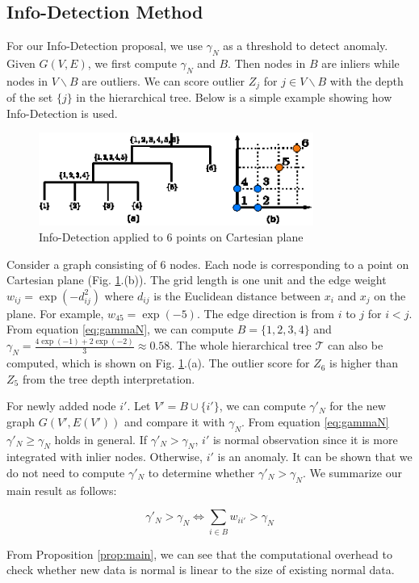 \documentclass[runningheads]{llncs}
\begin{document}
\subsection{Info-Detection Method}
For our Info-Detection proposal, we use $\gamma_N$ as a threshold to detect anomaly.  Given $G(V, E)$, we first compute $\gamma_N$ and $B$. Then nodes in $B$ are inliers while nodes in $V\backslash B$  are outliers. We can score outlier $Z_j$ for $j \in V\backslash B$ with the depth of the set $\{j\}$ in the hierarchical tree. Below is a simple example showing how Info-Detection is used.
\begin{example}
	\begin{figure}[!ht]
		\centering
		\includegraphics[width=9cm]{pic/outlier_example.eps}
		\caption{Info-Detection applied to 6 points on Cartesian plane}\label{fig:ex}
	\end{figure}
	Consider a graph consisting of 6 nodes. Each node is corresponding to a point on Cartesian plane (Fig. \ref{fig:ex}.(b)). The grid length is one unit and the edge weight $w_{ij} = \exp(-d_{ij}^2)$ where $d_{ij}$ is the Euclidean distance between $x_i$ and $x_j$ on the plane. For example, $w_{45} = \exp(-5)$. The edge direction is from $i$ to $j$ for $i<j$. From equation \eqref{eq:gammaN}, we can compute $B=\{1,2,3,4\}$ and $\gamma_N = \frac{4\exp(-1)+2\exp(-2)}{3}\approx 0.58$. The whole hierarchical tree $\mathcal{T}$ can also be computed, which is shown on Fig. \ref{fig:ex}.(a). The outlier score for $Z_6$ is higher than $Z_5$ from the tree depth interpretation.
\end{example}


For newly added node $i'$. Let $V'=B \cup \{i'\}$, we can compute $\gamma'_N$ for the new graph $G(V', E(V'))$ and compare it with $\gamma_N$. From equation \eqref{eq:gammaN} $\gamma'_N \geq \gamma_N$ holds in general. If $\gamma'_N>\gamma_N$, $i'$ is normal observation since it is more integrated with inlier nodes. Otherwise, $i'$ is an anomaly. It can be shown that we do not need to compute $\gamma'_N$ to determine whether $\gamma'_N>\gamma_N$. We summarize our main result as follows:
\begin{proposition}\label{prop:main}
\begin{equation}
\gamma'_N > \gamma_N \iff  \sum_{i \in B} w_{ii'} > \gamma_N 
\end{equation}
\end{proposition}
From Proposition \ref{prop:main}, we can see that the computational overhead to check whether new data is normal is linear to the size of existing normal data. 
\end{document}
